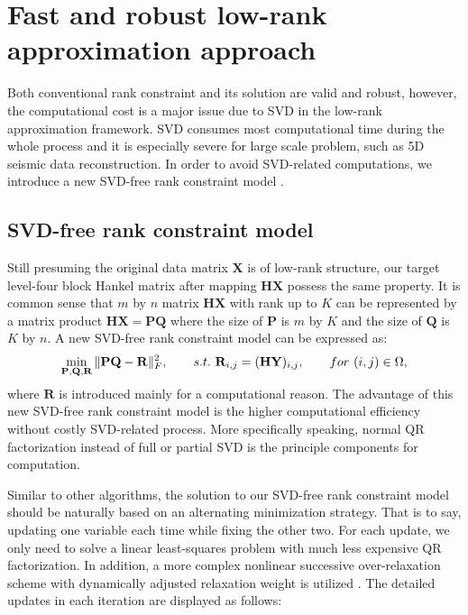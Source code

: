 \section{Fast and robust low-rank approximation approach}
Both conventional rank constraint and its solution are valid and robust, however, the computational cost is a major issue due to SVD in the low-rank approximation framework. SVD consumes most computational time during the whole process and it is especially severe for large scale problem, such as 5D seismic data reconstruction. In order to avoid SVD-related computations, we introduce a new SVD-free rank constraint model .

\subsection{SVD-free rank constraint model}
Still presuming the original data matrix $\mathbf{X}$ is of low-rank structure, our target level-four block Hankel matrix after mapping $\mathbf{H}\mathbf{X}$  possess the same property. It is common sense that $m$ by $n$ matrix $\mathbf{H}\mathbf{X}$ with rank up to $K$ can be represented by a matrix product $\mathbf{H}\mathbf{X}=\mathbf{P}\mathbf{Q}$ where the size of $\mathbf{P}$ is $m$ by $K$ and the size of $\mathbf{Q}$ is $K$ by $n$. A new SVD-free rank constraint model can be expressed as:
\begin{equation}
\label{eq:rank11}
\min_{\mathbf{P},\mathbf{Q},\mathbf{R}} \Arrowvert \mathbf{P}\mathbf{Q} -\mathbf{R}\Arrowvert_F^2, \qquad s.t. \ \mathbf{R}_{i,j}=(\mathbf{H}\mathbf{Y})_{i,j}, \qquad for \  (i,j) \in \Omega,
\end{equation}
where $\mathbf{R}$ is introduced mainly for a computational reason.  The advantage of this new SVD-free rank constraint model is the higher computational efficiency without costly SVD-related process. More specifically speaking, normal QR factorization instead of full or partial SVD is the principle components for computation. 

Similar to other algorithms, the solution to our SVD-free rank constraint model should be naturally based on an alternating minimization strategy. That is to say, updating one variable each time while fixing the other two. For each update, we only need to solve a linear least-squares problem with much less expensive QR factorization. In addition, a more complex nonlinear successive over-relaxation scheme with dynamically adjusted relaxation weight is utilized \cite{lmafit}. The detailed updates in each iteration are displayed as follows: 

